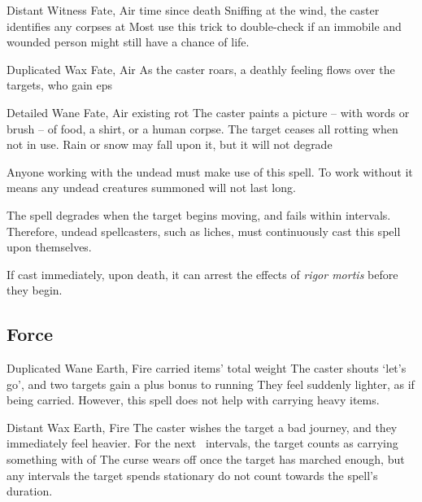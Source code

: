 \begin{multicols}{2}

  {Distant}%
  {Witness}%
  {Fate, Air}%
  {time since death}%
  {Sniffing at the wind, the caster identifies any corpses at \spellRange}%
  {Most use this trick to double-check if an immobile and wounded person might still have a chance of life.}

  {Duplicated}%
  {Wax}%
  {Fate, Air}%
  {}%
  {As the caster roars, a deathly feeling flows over the targets, who gain  \glspl{ep}}%
  {}

  {Detailed}%
  {Wane}%
  {Fate, Air}%
  {existing rot}%
  {The caster paints a picture -- with words or brush -- of food, a shirt, or a human corpse.
  The target ceases all rotting when not in use.
  Rain or snow may fall upon it, but it will not degrade}%
  {
    Anyone working with the undead must make use of this spell.
    To work without it means any undead creatures summoned will not last long.

    The spell degrades when the target begins moving, and fails within  \glspl{interval}.
    Therefore, undead spellcasters, such as liches, must continuously cast this spell upon themselves.

    If cast immediately, upon death, it can arrest the effects of \textit{rigor mortis} before they begin.
  }

\subsection{Force}


  {Duplicated}%
  {Wane}%
  {Earth, Fire}%
  {carried items' total \gls{weight}}%
  {The caster shouts `let's go', and two targets gain a plus  bonus to running}%
  {They feel suddenly lighter, as if being carried.
  However, this spell does not help with carrying heavy items.}

  {Distant}%
  {Wax}%
  {Earth, Fire}%
  {}%
  {The caster wishes the target a bad journey, and they immediately feel heavier.
  For the next ~\glspl{interval}, the target counts as carrying something with  of }%
  {
  The curse wears off once the target has marched enough, but any \glspl{interval} the target spends stationary do not count towards the spell's duration.}


\end{multicols}
